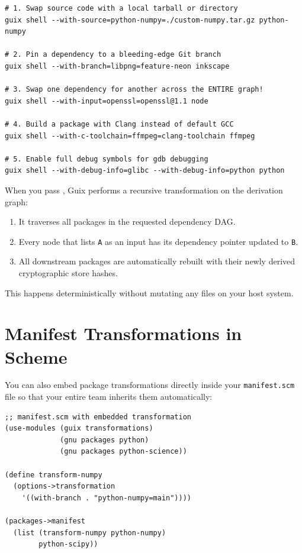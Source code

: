 \begin{lstlisting}[style=guixcli]
# 1. Swap source code with a local tarball or directory
guix shell --with-source=python-numpy=./custom-numpy.tar.gz python-numpy

# 2. Pin a dependency to a bleeding-edge Git branch
guix shell --with-branch=libpng=feature-neon inkscape

# 3. Swap one dependency for another across the ENTIRE graph!
guix shell --with-input=openssl=openssl@1.1 node

# 4. Build a package with Clang instead of default GCC
guix shell --with-c-toolchain=ffmpeg=clang-toolchain ffmpeg

# 5. Enable full debug symbols for gdb debugging
guix shell --with-debug-info=glibc --with-debug-info=python python
\end{lstlisting}

\begin{alchemybox}
When you pass , Guix performs a recursive transformation on the derivation graph:
\begin{enumerate}
  \item It traverses all packages in the requested dependency DAG.
  \item Every node that lists \texttt{A} as an input has its dependency pointer updated to \texttt{B}.
  \item All downstream packages are automatically rebuilt with their newly derived cryptographic store hashes.
\end{enumerate}
This happens deterministically without mutating any files on your host system.
\end{alchemybox}

\section{Manifest Transformations in Scheme}

You can also embed package transformations directly inside your \texttt{manifest.scm} file so that your entire team inherits them automatically:

\begin{lstlisting}[style=guixscheme]
;; manifest.scm with embedded transformation
(use-modules (guix transformations)
             (gnu packages python)
             (gnu packages python-science))

(define transform-numpy
  (options->transformation
    '((with-branch . "python-numpy=main"))))

(packages->manifest
  (list (transform-numpy python-numpy)
        python-scipy))
\end{lstlisting}

